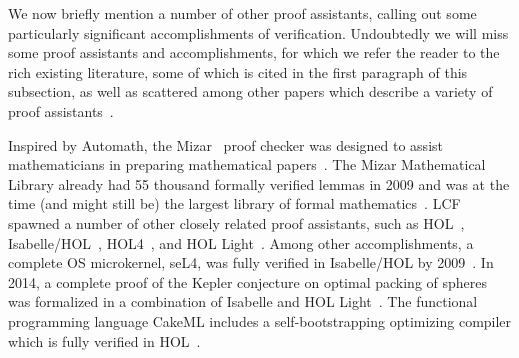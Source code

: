 
We now briefly mention a number of other proof assistants, calling out some particularly significant accomplishments of verification.
Undoubtedly we will miss some proof assistants and accomplishments, for which we refer the reader to the rich existing literature, some of which is cited in the first paragraph of this subsection, as well as scattered among other papers which describe a variety of proof assistants~\cite{Formalizing2009Wiedijk}.

Inspired by Automath, the Mizar~\cite{harrison-mizar,Rudnicki92anoverview,Matuszewski05mizar:the} proof checker was designed to assist mathematicians in preparing mathematical papers~\cite{Rudnicki92anoverview}.
The Mizar Mathematical Library already had 55 thousand formally verified lemmas in 2009 and was at the time (and might still be) the largest library of formal mathematics~\cite{Formalizing2009Wiedijk}.
LCF~\cite{LCF2000Gordon,gordon1979edinburgh,gordon1978metalanguage} spawned a number of other closely related proof assistants, such as HOL~\cite{Programming2000Barras,LCF2000Gordon}, Isabelle/HOL~\cite{LCF2019Paulson,Isabelle/Isar2002Wenzel,Isabelle,paulson1994isabelle}, HOL4~\cite{slind2008brief}, and HOL Light~\cite{harrison1996hol}.
Among other accomplishments, a complete OS microkernel, seL4, was fully verified in Isabelle/HOL by 2009~\cite{seL4SOSP09}.
In 2014, a complete proof of the Kepler conjecture on optimal packing of spheres was formalized in a combination of Isabelle and HOL Light~\cite{flyspeck,flyspeck2014Hales}.
The functional programming language CakeML includes a self-bootstrapping optimizing compiler which is fully verified in HOL~\cite{CakeML}.
